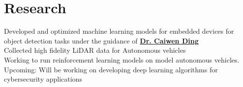 \documentclass[]{resume-template}
\begin{document}
\begin{minipage}[t]{0.66\textwidth}
        \section{Research}\label{sec:research}
        \textbullet{} Developed and optimized machine learning models for embedded devices for object detection tasks under the guidance of \textbf{\href{https://caiwending.cse.uconn.edu/}{Dr. Caiwen Ding}} \\
        \textbullet{} Collected high fidelity LiDAR data for Autonomous vehicles \\
        \textbullet{} Working to run reinforcement learning models on model autonomous vehicles. \\
        \textbullet{} Upcoming: Will be working on developing deep learning algorithms for cybersecurity applications  
        \sectionsep





\end{minipage}
\end{document}
